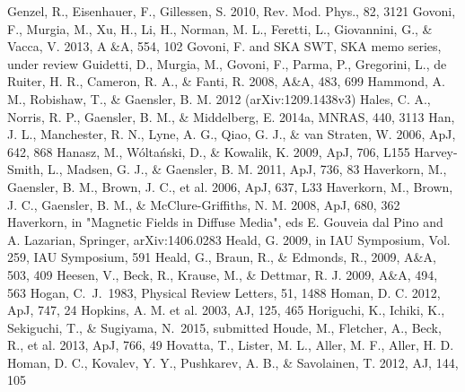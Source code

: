 \begin{thebibliography}{99}
\begin{multicols}{2}
{
	Genzel, R., Eisenhauer, F., Gillessen, S. 2010, Rev. Mod. Phys., 82, 3121
	Govoni, F., Murgia, M., Xu, H., Li, H., Norman, M. L., Feretti, L., Giovannini, G., \& Vacca, V. 2013, A \&A, 554, 102
	Govoni, F. and SKA SWT, SKA memo series, under review
	Guidetti, D., Murgia, M., Govoni, F., Parma, P., Gregorini, L., de Ruiter, H. R., Cameron, R. A., \& Fanti, R. 2008, A\&A, 483, 699
	Hammond, A. M., Robishaw, T., \& Gaensler, B. M. 2012 (arXiv:1209.1438v3)
	Hales, C. A., Norris, R. P., Gaensler, B. M., \& Middelberg, E. 2014a, MNRAS, 440, 3113
	Han, J. L., Manchester, R. N., Lyne, A. G., Qiao, G. J., \& van Straten, W. 2006, ApJ, 642, 868
	Hanasz, M., W\'olta\'nski, D., \& Kowalik, K. 2009, ApJ, 706, L155
	Harvey-Smith, L., Madsen, G. J., \& Gaensler, B. M. 2011, ApJ, 736, 83
	Haverkorn, M., Gaensler, B. M., Brown, J. C., et al. 2006, ApJ, 637, L33
	Haverkorn, M., Brown, J. C., Gaensler, B. M., \& McClure-Griffiths, N. M. 2008, ApJ, 680, 362
	Haverkorn, in "Magnetic Fields in Diffuse Media", eds E. Gouveia dal Pino and A. Lazarian, Springer, arXiv:1406.0283
	Heald, G. 2009, in IAU Symposium, Vol. 259, IAU Symposium, 591
	Heald, G., Braun, R., \& Edmonds, R., 2009, A\&A, 503, 409
	Heesen, V., Beck, R., Krause, M., \& Dettmar, R. J. 2009, A\&A, 494, 563
	Hogan, C.~J.\ 1983, Physical Review Letters, 51, 1488 
	Homan, D. C. 2012, ApJ, 747, 24
	Hopkins, A. M. et al. 2003, AJ, 125, 465
	Horiguchi, K., Ichiki, K., Sekiguchi, T., \& Sugiyama, N.\ 2015, submitted
	Houde, M., Fletcher, A., Beck, R., et al. 2013, ApJ, 766, 49
	Hovatta, T., Lister, M. L., Aller, M. F., Aller, H. D. Homan, D. C., Kovalev, Y. Y., Pushkarev, A. B., \& Savolainen, T. 2012, AJ, 144, 105
}
\end{multicols}
\end{thebibliography}
